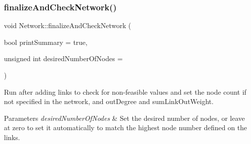 \subsubsection{\texorpdfstring{finalize\+And\+Check\+Network()}{finalizeAndCheckNetwork()}}
{\footnotesize\ttfamily void Network\+::finalize\+And\+Check\+Network (\begin{DoxyParamCaption}\item[{bool}]{print\+Summary = {\ttfamily true},  }\item[{unsigned int}]{desired\+Number\+Of\+Nodes = {} }\end{DoxyParamCaption})}

Run after adding links to check for non-\/feasible values and set the node count if not specified in the network, and out\+Degree and sum\+Link\+Out\+Weight. 
\begin{DoxyParams}{Parameters}
{\em desired\+Number\+Of\+Nodes} & Set the desired number of nodes, or leave at zero to set it automatically to match the highest node number defined on the links. \\
\hline
\end{DoxyParams}

